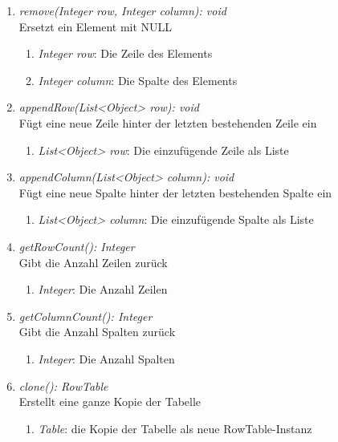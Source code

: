 \begin{enumerate}[+]
	\item \textit{remove(Integer row, Integer column): void} \\
	Ersetzt ein Element mit NULL
	\begin{enumerate}[$\bullet$]
		\item \textit{Integer row}: Die Zeile des Elements
		\item \textit{Integer column}: Die Spalte des Elements
	\end{enumerate}
	\vspace{-0.2cm}
	
	\item \textit{appendRow(List<Object> row): void} \\
	Fügt eine neue Zeile hinter der letzten bestehenden Zeile ein
	\begin{enumerate}[$\bullet$]
		\item \textit{List<Object> row}: Die einzufügende Zeile als Liste
	\end{enumerate}
	\vspace{-0.2cm}
	
	\item \textit{appendColumn(List<Object> column): void} \\
	Fügt eine neue Spalte hinter der letzten bestehenden Spalte ein
	\begin{enumerate}[$\bullet$]
		\item \textit{List<Object> column}: Die einzufügende Spalte als Liste
	\end{enumerate}
	\vspace{-0.2cm}
	
	\item \textit{getRowCount(): Integer} \\
	Gibt die Anzahl Zeilen zurück
	\vspace{-0.2cm}
	\begin{enumerate}[$\circ$]
		\item \textit{Integer}: Die Anzahl Zeilen
	\end{enumerate}
	
	\item \textit{getColumnCount(): Integer} \\
	Gibt die Anzahl Spalten zurück
	\vspace{-0.2cm}
	\begin{enumerate}[$\circ$]
		\item \textit{Integer}: Die Anzahl Spalten
	\end{enumerate}
	
	\item \textit{clone(): RowTable} \\
	Erstellt eine ganze Kopie der Tabelle
	\vspace{-0.2cm}
	\begin{enumerate}[$\circ$]
		\item \textit{Table}: die Kopie der Tabelle als neue RowTable-Instanz
	\end{enumerate}
	

\end{enumerate}
